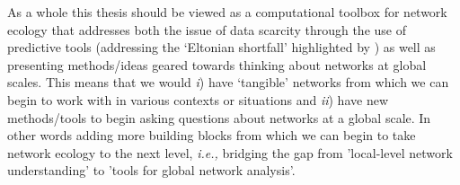 \begin{refsection}
As a whole this thesis should be viewed as a computational toolbox for
network ecology that addresses both the issue of data scarcity through
the use of predictive tools (addressing the `Eltonian shortfall' highlighted by \cite{Hortal2015Seven}) as well as presenting methods/ideas geared towards thinking about networks at global scales. This means that we would \emph{i}) have `tangible' networks from which we can begin to work with in various contexts or situations and \emph{ii}) have new methods/tools to begin asking questions about networks at a global scale. In other words adding more building blocks from which we can begin to take network ecology to the next level, \emph{i.e.,} bridging the gap from 'local-level network understanding' to 'tools for global network analysis'.

\printbibliography{}
\end{refsection}

\endinput
